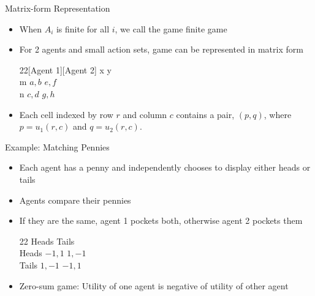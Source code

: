 \documentclass[11pt,aspectratio=169,handout]{beamer}
\begin{document}
  \begin{frame}{Matrix-form Representation}
   \begin{itemize}[<+->]
    \item When $A_i$ is finite for all $i$, we call the game \alert{finite game}
    \item For 2 agents and small action sets, game can be represented in \alert{matrix form}
    \vspace{0.7em}
    \begin{center}
     \hspace{-5.6em}
     \begin{game}{2}{2}[Agent 1][Agent 2]
      	\> x		\> y		\\
      m	\> $a,b$	\> $e,f$	\\
      n	\> $c,d$	\> $g,h$
     \end{game}
    \end{center}
    \vspace{0.7em}
    \item Each cell indexed by  row $r$ and column $c$ contains a pair, $(p,q)$, where $p = u_1(r,c)$ and $q = u_2(r,c)$.
   \end{itemize}
  \end{frame}
 
  \begin{frame}{Example: Matching Pennies}
   \begin{itemize}
    \item Each agent has a penny and independently chooses to display either heads or tails
    \item Agents compare their pennies
    \item<+-> If they are the same, agent 1 pockets both, otherwise agent 2 pockets them
    \begin{center}
     \hspace{-3.5em}
     \begin{game}{2}{2}
      		\> Heads		\> Tails		\\
      Heads	\> $-1,1$	\> $1,-1$	\\
      Tails	\> $1,-1$	\> $-1,1$
     \end{game}
    \end{center}
    \vspace{0.7em}
    \item<+-> \alert{Zero-sum game}: Utility of one agent is negative of utility of other agent
   \end{itemize}
  \end{frame}
\end{document}

